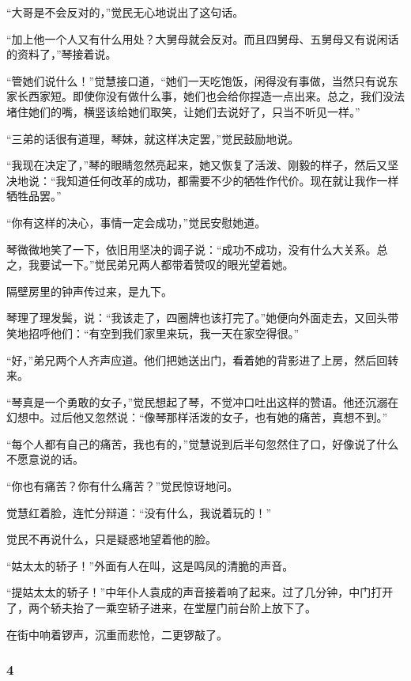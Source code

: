 \par “大哥是不会反对的，”觉民无心地说出了这句话。
\par “加上他一个人又有什么用处？大舅母就会反对。而且四舅母、五舅母又有说闲话的资料了，”琴接着说。
\par “管她们说什么！”觉慧接口道，“她们一天吃饱饭，闲得没有事做，当然只有说东家长西家短。即使你没有做什么事，她们也会给你捏造一点出来。总之，我们没法堵住她们的嘴，横竖该给她们取笑，让她们去说好了，只当不听见一样。”
\par “三弟的话很有道理，琴妹，就这样决定罢，”觉民鼓励地说。
\par “我现在决定了，”琴的眼睛忽然亮起来，她又恢复了活泼、刚毅的样子，然后又坚决地说：“我知道任何改革的成功，都需要不少的牺牲作代价。现在就让我作一样牺牲品罢。”
\par “你有这样的决心，事情一定会成功，”觉民安慰她道。
\par 琴微微地笑了一下，依旧用坚决的调子说：“成功不成功，没有什么大关系。总之，我要试一下。”觉民弟兄两人都带着赞叹的眼光望着她。
\par 隔壁房里的钟声传过来，是九下。
\par 琴理了理发鬓，说：“我该走了，四圈牌也该打完了。”她便向外面走去，又回头带笑地招呼他们：“有空到我们家里来玩，我一天在家空得很。”
\par “好，”弟兄两个人齐声应道。他们把她送出门，看着她的背影进了上房，然后回转来。
\par “琴真是一个勇敢的女子，”觉民想起了琴，不觉冲口吐出这样的赞语。他还沉溺在幻想中。过后他又忽然说：“像琴那样活泼的女子，也有她的痛苦，真想不到。”
\par “每个人都有自己的痛苦，我也有的，”觉慧说到后半句忽然住了口，好像说了什么不愿意说的话。
\par “你也有痛苦？你有什么痛苦？”觉民惊讶地问。
\par 觉慧红着脸，连忙分辩道：“没有什么，我说着玩的！”
\par 觉民不再说什么，只是疑惑地望着他的脸。
\par “姑太太的轿子！”外面有人在叫，这是鸣凤的清脆的声音。
\par “提姑太太的轿子！”中年仆人袁成的声音接着响了起来。过了几分钟，中门打开了，两个轿夫抬了一乘空轿子进来，在堂屋门前台阶上放下了。
\par 在街中响着锣声，沉重而悲怆，二更锣敲了。


\subsubsection*{4}

